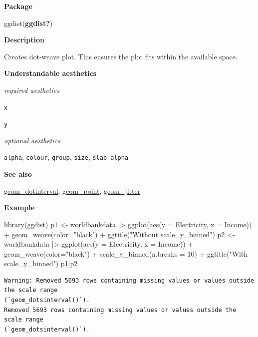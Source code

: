 \documentclass[
  letterpaper,
  DIV=11,
  numbers=noendperiod]{scrreprt}
\newenvironment{Shaded}{\begin{snugshade}}{\end{snugshade}}
\newcommand{\AttributeTok}[1]{\textcolor[rgb]{0.40,0.45,0.13}{#1}}
\newcommand{\DecValTok}[1]{\textcolor[rgb]{0.68,0.00,0.00}{#1}}
\newcommand{\FunctionTok}[1]{\textcolor[rgb]{0.28,0.35,0.67}{#1}}
\newcommand{\NormalTok}[1]{\textcolor[rgb]{0.00,0.23,0.31}{#1}}
\newcommand{\OtherTok}[1]{\textcolor[rgb]{0.00,0.23,0.31}{#1}}
\newcommand{\SpecialCharTok}[1]{\textcolor[rgb]{0.37,0.37,0.37}{#1}}
\newcommand{\StringTok}[1]{\textcolor[rgb]{0.13,0.47,0.30}{#1}}
\begin{document}
\textbf{Package}

ggdist(\textbf{ggdist?})

\textbf{Description}

Creates dot-weave plot. This ensures the plot fits within the available
space.

\textbf{Understandable aesthetics}

\emph{required aesthetics}

\texttt{x}

\texttt{y}

\emph{optional aesthetics}

\texttt{alpha}, \texttt{colour}, \texttt{group}, \texttt{size},
\texttt{slab\_alpha}

\textbf{See also}

\hyperref[dotinterval]{geom\_dotinterval},
\hyperref[point]{geom\_point}, \hyperref[jitter]{geom\_jitter}

\textbf{Example}

\begin{Shaded}
\begin{Highlighting}[]
\FunctionTok{library}\NormalTok{(ggdist)}
\NormalTok{p1 }\OtherTok{\textless{}{-}}\NormalTok{ worldbankdata }\SpecialCharTok{|\textgreater{}}
  \FunctionTok{ggplot}\NormalTok{(}\FunctionTok{aes}\NormalTok{(}\AttributeTok{y =}\NormalTok{ Electricity, }\AttributeTok{x =}\NormalTok{ Income)) }\SpecialCharTok{+}
  \FunctionTok{geom\_weave}\NormalTok{(}\AttributeTok{color=}\StringTok{"black"}\NormalTok{) }\SpecialCharTok{+} \FunctionTok{ggtitle}\NormalTok{(}\StringTok{"Without  scale\_y\_binned"}\NormalTok{)}
\NormalTok{p2 }\OtherTok{\textless{}{-}}\NormalTok{ worldbankdata }\SpecialCharTok{|\textgreater{}}
  \FunctionTok{ggplot}\NormalTok{(}\FunctionTok{aes}\NormalTok{(}\AttributeTok{y =}\NormalTok{ Electricity, }\AttributeTok{x =}\NormalTok{ Income)) }\SpecialCharTok{+}
  \FunctionTok{geom\_weave}\NormalTok{(}\AttributeTok{color=}\StringTok{"black"}\NormalTok{) }\SpecialCharTok{+} 
  \FunctionTok{scale\_y\_binned}\NormalTok{(}\AttributeTok{n.breaks =} \DecValTok{10}\NormalTok{) }\SpecialCharTok{+} \FunctionTok{ggtitle}\NormalTok{(}\StringTok{"With scale\_y\_binned"}\NormalTok{)}
\NormalTok{p1}\SpecialCharTok{|}\NormalTok{p2}
\end{Highlighting}
\end{Shaded}

\begin{verbatim}
Warning: Removed 5693 rows containing missing values or values outside the scale range
(`geom_dotsinterval()`).
Removed 5693 rows containing missing values or values outside the scale range
(`geom_dotsinterval()`).
\end{verbatim}
\end{document}
